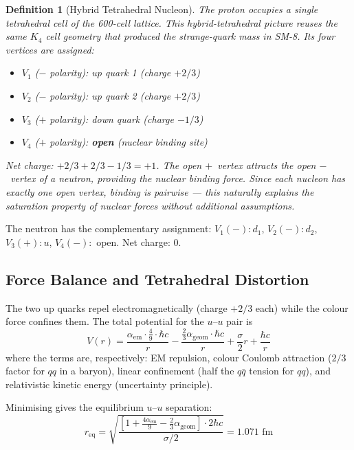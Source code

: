 \documentclass[12pt,a4paper]{article}
\newtheorem{definition}{Definition}
\begin{document}
\begin{definition}[Hybrid Tetrahedral Nucleon]
The proton occupies a single tetrahedral cell of the 600-cell lattice. This hybrid-tetrahedral picture reuses the same $K_4$ cell geometry that produced the strange-quark mass in SM-8. Its four vertices are assigned:
\begin{itemize}
\item $V_1$ ($-$ polarity): up quark 1 (charge $+2/3$)
\item $V_2$ ($-$ polarity): up quark 2 (charge $+2/3$)
\item $V_3$ ($+$ polarity): down quark (charge $-1/3$)
\item $V_4$ ($+$ polarity): \textbf{open} (nuclear binding site)
\end{itemize}
Net charge: $+2/3 + 2/3 - 1/3 = +1$. The open $+$~vertex attracts the open $-$~vertex of a neutron, providing the nuclear binding force. Since each nucleon has exactly \emph{one} open vertex, binding is pairwise --- this naturally explains the saturation property of nuclear forces without additional assumptions.
\end{definition}

The neutron has the complementary assignment: $V_1(-): d_1$, $V_2(-): d_2$, $V_3(+): u$, $V_4(-):$ open. Net charge: $0$.

\subsection{Force Balance and Tetrahedral Distortion}

The two up quarks repel electromagnetically (charge $+2/3$ each) while the colour force confines them. The total potential for the $u$--$u$ pair is
\begin{equation}
V(r) = \frac{\alpha_{\mathrm{em}} \cdot \frac{4}{9} \cdot \hbar c}{r} - \frac{\frac{2}{3}\alpha_{\mathrm{geom}} \cdot \hbar c}{r} + \frac{\sigma}{2}r + \frac{\hbar c}{r}
\label{eq:potential}
\end{equation}
where the terms are, respectively: EM repulsion, colour Coulomb attraction ($2/3$ factor for $qq$ in a baryon), linear confinement (half the $q\bar{q}$ tension for $qq$), and relativistic kinetic energy (uncertainty principle).

Minimising gives the equilibrium $u$--$u$ separation:
\begin{equation}
r_{\mathrm{eq}} = \sqrt{\frac{\left[1 + \frac{4\alpha_{\mathrm{em}}}{9} - \frac{2}{3}\alpha_{\mathrm{geom}}\right] \cdot 2\hbar c}{\sigma/2}} = 1.071 \text{ fm}
\end{equation}
\end{document}
